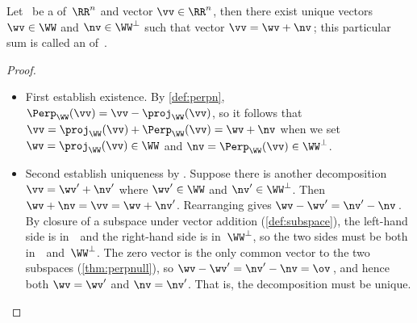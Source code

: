 \begin{theorem} \label{thm:odt}
Let \WW\ be a  of~\(\RR^n\) and vector \(\vv\in\RR^n\), then there exist unique vectors \(\wv\in\WW\) and \(\nv\in\WW^\perp\) such that vector \(\vv=\wv+\nv\)\,; this particular sum is called an  of~\vv.
\end{theorem}

\begin{proof} 
\begin{itemize}
\item First establish existence.  
By \autoref{def:perpn}, \(\Perp_\WW(\vv)=\vv-\proj_\WW(\vv)\), so it follows that \(\vv=\proj_\WW(\vv)+\Perp_\WW(\vv)=\wv+\nv\) when we set \(\wv=\proj_\WW(\vv)\in\WW\) and \(\nv=\Perp_\WW(\vv)\in\WW^\perp\).

\item Second establish uniqueness by .
Suppose there is another decomposition \(\vv=\wv'+\nv'\) where \(\wv'\in\WW\) and \(\nv'\in\WW^\perp\).
Then \(\wv+\nv=\vv=\wv+\nv'\).
Rearranging gives \(\wv-\wv'=\nv'-\nv\)\,.
By closure of a subspace under vector addition (\autoref{def:subspace}), the left-hand side is in~\WW\ and the right-hand side is in~\(\WW^\perp\), so the two sides must be both in~\WW\ and~\(\WW^\perp\).
The zero vector is the only common vector to the two subspaces (\autoref{thm:perpnull}), so \(\wv-\wv'=\nv'-\nv=\ov\)\,, and hence both \(\wv=\wv'\) and \(\nv=\nv'\).
That is, the decomposition must be unique.
\end{itemize}
\end{proof}



